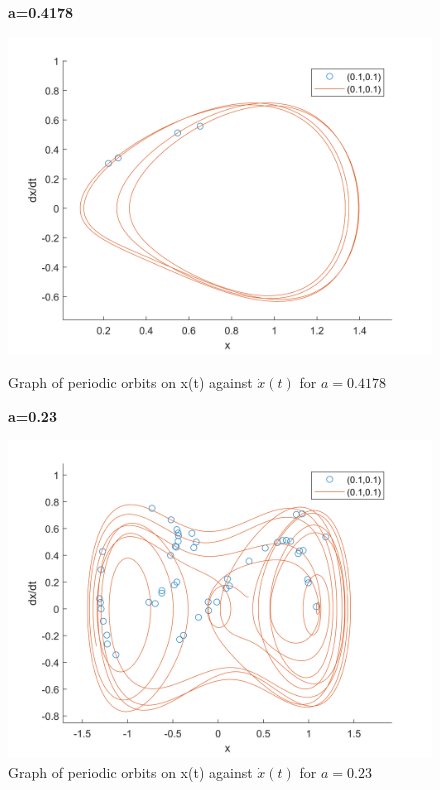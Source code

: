 \documentclass[10pt]{article}
\begin{document}
\begin{figure}[H]
    \begin{minipage}[b]{0.5\linewidth}
            \centering
            \textbf{a=0.4178}\par
            \includegraphics[width=\textwidth]{Files/q5,a=0.4178.png}
            \caption{Graph of periodic orbits on x(t) against $\dot{x}(t)$ for $a=0.4178$}
        \end{minipage}
        \hfill
        \begin{minipage}[b]{0.5\linewidth}
            \centering
            \textbf{a=0.23}\par
            \includegraphics[width=\textwidth]{Files/q5,a=0.23.png}
            \caption{Graph of periodic orbits on x(t) against $\dot{x}(t)$ for $a=0.23$}
        \end{minipage}
\end{figure}
\end{document}
